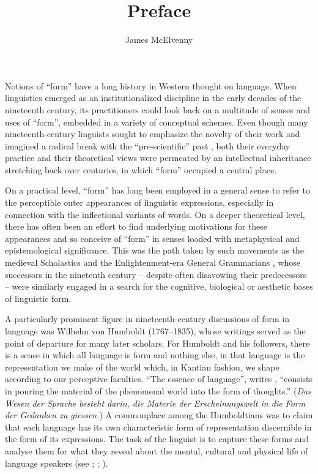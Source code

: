 \documentclass[output=paper]{langscibook}
\author{James McElvenny \affiliation{University of Edinburgh}}
\title{Preface}
\begin{document}
\maketitle
Notions of ``form'' have a long history in Western thought on language. When linguistics emerged as an institutionalized discipline in the early decades of the nineteenth century, its practitioners could look back on a multitude of senses and uses of ``form'', embedded in a variety of conceptual schemes. Even though many nineteenth-century linguists sought to emphasize the novelty of their work and imagined a radical break with the ``pre-scientific'' past \citep[see][chap. 1]{MorpurgoDavies1998}, both their everyday practice and their theoretical views were permeated by an intellectual inheritance stretching back over centuries, in which ``form'' occupied a central place.

On a practical level, ``form'' has long been employed in a general sense to refer to the perceptible outer appearances of linguistic expressions, especially in connection with the inflectional variants of words. On a deeper theoretical level, there has often been an effort to find underlying motivations for these appearances and so conceive of ``form'' in senses loaded with metaphysical and epistemological significance. This was the path taken by such movements as the medieval Scholastics and the Enlightenment-era General Grammarians \citep[see][chaps. 8 and 11]{Law2003}, whose successors in the ninetenth century – despite often disavowing their predecessors – were similarly engaged in a search for the cognitive, biological or aesthetic bases of linguistic form. 

A particularly prominent figure in nineteenth-century discussions of form in language was Wilhelm von Humboldt (1767–1835), whose writings served as the point of departure for many later scholars. For Humboldt and his followers, there is a sense in which all language is form and nothing else, in that language is the representation we make of the world which, in Kantian fashion, we shape according to our perceptive faculties. ``The essence of language'', writes \citet[17]{Humboldt19051820}, ``consists in pouring the material of the phenomenal world into the form of thoughts.'' (\emph{Das Wesen der Sprache besteht darin, die Materie der Erscheinungswelt in die Form der Gedanken zu giessen.}) A commonplace among the Humboldtians was to claim that each language has its own characteristic form of representation discernible in the form of its expressions. The task of the linguist is to capture these forms and analyse them for what they reveal about the mental, cultural and physical life of language speakers (see \citealt[chap. 5]{MorpurgoDavies1998}; \citealt{Trabant1986}; \citealt{McElvenny2016}). 
\end{document}
